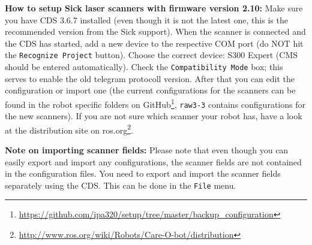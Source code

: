 \textbf{How to setup Sick laser scanners with firmware version 2.10:}
Make sure you have CDS 3.6.7 installed (even though it is not the latest one, this is the recommended version from the Sick support).
When the scanner is connected and the CDS has started, add a new device to the respective COM port (do NOT hit the \texttt{Recognize Project} button).
Choose the correct device: S300 Expert (CMS should be entered automatically).
Check the \texttt{Compatibility Mode} box; this serves to enable the old telegram protocoll version.
After that you can edit the configuration or import one (the current configurations for the scanners can be found in the robot specific folders on GitHub\footnote{\url{https://github.com/ipa320/setup/tree/master/backup_configuration}}, \texttt{raw3-3} contains configurations for the new scanners).
If you are not sure which scanner your robot has, have a look at the distribution site on ros.org\footnote{\url{http://www.ros.org/wiki/Robots/Care-O-bot/distribution}}.

\textbf{Note on importing scanner fields:}
Please note that even though you can easily export and import any configurations, the scanner fields are not contained in the configuration files.
You need to export and import the scanner fields separately using the CDS.
This can be done in the \texttt{File} menu.

